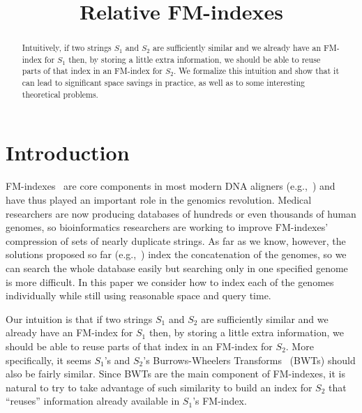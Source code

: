 \documentclass{llncs}
\begin{document}
\title{Relative FM-indexes}


\maketitle

\begin{abstract}
Intuitively, if two strings $S_1$ and $S_2$ are sufficiently similar and we already have an FM-index for $S_1$ then, by storing a little extra information, we should be able to reuse parts of that index in an FM-index for $S_2$.  We formalize this intuition and show that it can lead to significant space savings in practice, as well as to some interesting theoretical problems.
\end{abstract}


\section{Introduction} \label{sec:introduction}

FM-indexes~\cite{FM05} are core components in most modern DNA aligners
(e.g.,~\cite{LTPS09,LD09,LYLLYKW09}) and have thus played an important role
in the genomics revolution.  Medical researchers are now producing databases
of hundreds or even thousands of human genomes, so bioinformatics researchers
are working to improve FM-indexes' compression of sets of nearly duplicate
strings.  As far as we know, however, the solutions proposed so far
(e.g.,~\cite{FGHP14,MNSV10}) index the concatenation of the genomes, so we
can search the whole database easily but searching only in one specified
genome is more difficult.  In this paper we consider how to index each of the
genomes individually while still using reasonable space and query time.

Our intuition is that if two strings $S_1$ and $S_2$ are sufficiently similar
and we already have an FM-index for $S_1$ then, by storing a little extra
information, we should be able to reuse parts of that index in an FM-index
for $S_2$. More specifically, it seems $S_1$'s and $S_2$'s Burrows-Wheelers
Transforms~\cite{BW94} (BWTs) should also be fairly similar. Since BWTs are
the main component of FM-indexes, it is natural to try to take advantage of
such similarity to build an index for $S_2$ that ``reuses'' information
already available in $S_1$'s FM-index.
\end{document}
